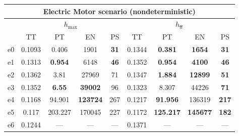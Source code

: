 \begin{tabular}{||c||c|c|c|c|c|c|c|c||}%
\multicolumn{9}{c}{\textbf{Electric Motor scenario (nondeterministic)}}\\%
\hline%
&\multicolumn{4}{||c||}{$h_{\max}$}&\multicolumn{4}{||c||}{$h_{\mathsf{ff}}$}\\%
\hline%
&\small{TT}&\small{PT}&\small{EN}&\small{PS}&\small{TT}&\small{PT}&\small{EN}&\small{PS}\\%
\hline%
\hline%
e0&\small{0.1093}&\small{0.406}&\small{1901}&\small{\textbf{31}}&\small{0.1344}&\small{\textbf{0.381}}&\small{\textbf{1654}}&\small{\textbf{31}}\\%
\hline%
e1&\small{0.1313}&\small{\textbf{0.954}}&\small{6148}&\small{\textbf{46}}&\small{0.1352}&\small{\textbf{0.954}}&\small{\textbf{4100}}&\small{\textbf{46}}\\%
\hline%
e2&\small{0.1362}&\small{3.81}&\small{27969}&\small{71}&\small{0.1347}&\small{\textbf{1.884}}&\small{\textbf{12899}}&\small{\textbf{51}}\\%
\hline%
e3&\small{0.1352}&\small{\textbf{6.55}}&\small{\textbf{39002}}&\small{96}&\small{0.1323}&\small{8.307}&\small{44226}&\small{\textbf{71}}\\%
\hline%
e4&\small{0.1168}&\small{94.901}&\small{\textbf{123724}}&\small{267}&\small{0.1217}&\small{\textbf{91.956}}&\small{136319}&\small{\textbf{217}}\\%
\hline%
e5&\small{0.117}&\small{203.227}&\small{170045}&\small{227}&\small{0.1172}&\small{\textbf{125.217}}&\small{\textbf{145677}}&\small{\textbf{182}}\\%
\hline%
e6&\small{0.1244}&\small{---}&\small{---}&\small{---}&\small{0.1371}&\small{---}&\small{---}&\small{---}\\%
\hline%
\end{tabular}